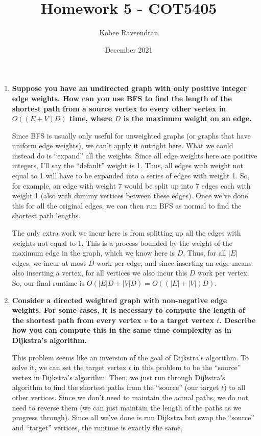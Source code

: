 \documentclass[12pt]{article}
\title{Homework 5 - COT5405}
\author{Kobee Raveendran}
\date{December 2021}
\begin{document}
    \maketitle

    \begin{enumerate}
        \item \textbf{Suppose you have an undirected graph with only positive integer edge weights. How can you use BFS to find 
        the length of the shortest path from a source vertex to every other vertex in $O((E+V)D)$ time, where $D$ is the 
        maximum weight on an edge.}

        Since BFS is usually only useful for unweighted graphs (or graphs that have uniform edge weights), we can't apply 
        it outright here. What we could instead do is ``expand'' all the weights. Since all edge weights here are 
        positive integers, I'll say the ``default'' weight is 1. Thus, all edges with weight not equal to 1 will have 
        to be expanded into a series of edges with weight 1. So, for example, an edge with weight 7 would be split up 
        into 7 edges each with weight 1 (also with dummy vertices between these edges). Once we've done this for all the 
        original edges, we can then run BFS as normal to find the shortest path lengths.

        The only extra work we incur here is from splitting up all the edges with weights not equal to 1. This is a 
        process bounded by the weight of the maximum edge in the graph, which we know here is $D$. Thus, for all $|E|$ edges, we incur at 
        most $D$ work per edge, and since inserting an edge means also inserting a vertex, for all vertices we also incur 
        this $D$ work per vertex. So, our final runtime is $O(|E|D + |V|D) = O((|E| + |V|)D)$.

        \item \textbf{Consider a directed weighted graph with non-negative edge weights. For some cases, it is necessary 
        to compute the length of the shortest path from every vertex $v$ to a target vertex $t$. Describe how you can 
        compute this in the same time complexity as in Dijkstra's algorithm.}

        This problem seems like an inversion of the goal of Dijkstra's algorithm. To solve it, we can set the 
        target vertex $t$ in this problem to be the ``source'' vertex in Dijkstra's algorithm. Then, we just run through 
        Dijkstra's algorithm to find the shortest paths from the ``source'' (our target $t$) to all other vertices. 
        Since we don't need to maintain the actual paths, we do not need to reverse them (we can just maintain the length 
        of the paths as we progress through). Since all we've done is run Dijkstra but swap the ``source'' and ``target'' 
        vertices, the runtime is exactly the same.


\end{enumerate}
\end{document}
